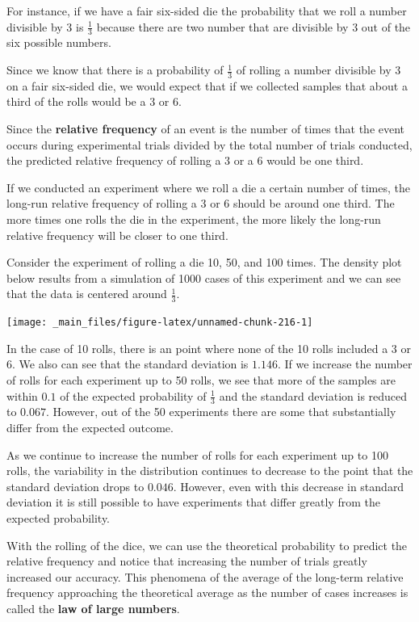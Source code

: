 \documentclass[
]{book}
\theoremstyle{definition}
\theoremstyle{definition}
\theoremstyle{definition}
\theoremstyle{definition}
\theoremstyle{remark}
\begin{document}
For instance, if we have a fair six-sided die the probability that we roll a number divisible by 3 is \(\frac{1}{3}\) because there are two number that are divisible by 3 out of the six possible numbers.

Since we know that there is a probability of \(\frac{1}{3}\) of rolling a number divisible by 3 on a fair six-sided die, we would expect that if we collected samples that about a third of the rolls would be a \(3\) or \(6\).

Since the \textbf{relative frequency} of an event is the number of times that the event occurs during experimental trials divided by the total number of trials conducted, the predicted relative frequency of rolling a \(3\) or a \(6\) would be one third.

If we conducted an experiment where we roll a die a certain number of times, the long-run relative frequency of rolling a 3 or 6 should be around one third. The more times one rolls the die in the experiment, the more likely the long-run relative frequency will be closer to one third.

Consider the experiment of rolling a die 10, 50, and 100 times. The density plot below results from a simulation of 1000 cases of this experiment and we can see that the data is centered around \(\frac{1}{3}\).

\begin{center}\texttt{[image: \_main\_files/figure-latex/unnamed-chunk-216-1]} \end{center}

In the case of 10 rolls, there is an point where none of the 10 rolls included a 3 or 6. We also can see that the standard deviation is \(1.146\). If we increase the number of rolls for each experiment up to 50 rolls, we see that more of the samples are within \(0.1\) of the expected probability of \(\frac{1}{3}\) and the standard deviation is reduced to \(0.067\). However, out of the 50 experiments there are some that substantially differ from the expected outcome.

As we continue to increase the number of rolls for each experiment up to 100 rolls, the variability in the distribution continues to decrease to the point that the standard deviation drops to \(0.046\). However, even with this decrease in standard deviation it is still possible to have experiments that differ greatly from the expected probability.

With the rolling of the dice, we can use the theoretical probability to predict the relative frequency and notice that increasing the number of trials greatly increased our accuracy. This phenomena of the average of the long-term relative frequency approaching the theoretical average as the number of cases increases is called the \textbf{law of large numbers}.
\end{document}

